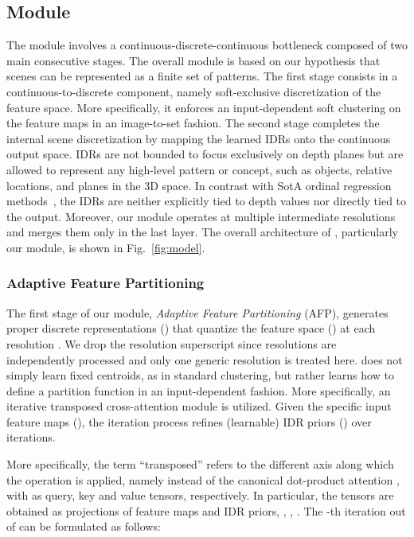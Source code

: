 \subsection{\ourmodulename Module}
\label{sec:method_idd}
The \ourmodule module involves a continuous-discrete-continuous bottleneck composed of two main consecutive stages. The overall module is based on our hypothesis that scenes can be represented as a finite set of patterns. The first stage consists in a continuous-to-discrete component, namely soft-exclusive discretization of the feature space. More specifically, it enforces an input-dependent soft clustering on the feature maps in an image-to-set fashion. The second stage completes the internal scene discretization by mapping the learned IDRs onto the continuous output space. IDRs are not bounded to focus exclusively on depth planes but are allowed to represent any high-level pattern or concept, such as objects, relative locations, and planes in the 3D space. In contrast with SotA ordinal regression methods~\cite{Fu2018, Bhat2020, Bhat2022}, the IDRs are neither explicitly tied to depth values nor directly tied to the output. Moreover, our module operates at multiple intermediate resolutions and merges them only in the last layer. The overall architecture of \ourmodel, particularly our \ourmodule module, is shown in Fig.~\ref{fig:model}.

\subsubsection{Adaptive Feature Partitioning}
\label{sec:method_idd_afp}
The first stage of our \ourmodule module, \emph{Adaptive Feature Partitioning} (AFP), generates proper discrete representations () that quantize the feature space () at each resolution . We drop the resolution superscript  since resolutions are independently processed and only one generic resolution is treated here. \ourmodel does not simply learn fixed centroids, as in standard clustering, but rather learns how to define a partition function in an input-dependent fashion. More specifically, an iterative transposed cross-attention module is utilized. Given the specific input feature maps (), the iteration process refines (learnable) IDR priors () over  iterations. 

More specifically, the term ``transposed'' refers to the different axis along which the  operation is applied, namely  instead of the canonical dot-product attention , with  as query, key and value tensors, respectively. In particular, the tensors are obtained as projections of feature maps and IDR priors, , , . The -th iteration out of  can be formulated as follows:

